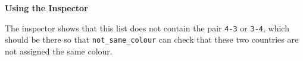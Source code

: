 \begin{center}
\parbox{0.49\textwidth}{}
\parbox{0.49\textwidth}{}

\vspace{3mm}
{\bf Using the Inspector}
\end{center}

The inspector shows that this list does not contain the pair \verb'4-3' or
\verb'3-4', which should be there so that \verb'not_same_colour'
can check that these two countries  are not assigned the same colour.

